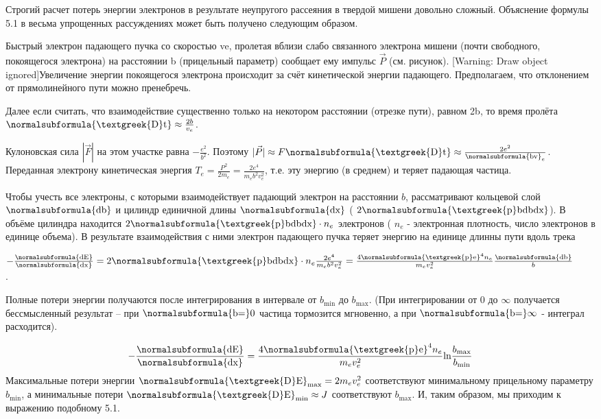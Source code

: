 \documentclass[a4paper,14pt, openany, twoside, draft]{extbook} %
\begin{document}
Строгий расчет потерь энергии электронов в результате неупругого рассеяния в твердой мишени довольно сложный. Объяснение формулы 5.1 в весьма упрощенных рассуждениях может быть получено следующим образом.

Быстрый электрон падающего пучка со скоростью ve, пролетая вблизи слабо связанного электрона мишени (почти свободного, покоящегося электрона) на расстоянии b (прицельный параметр) сообщает ему импульс  $\vec P$ (см. рисунок).  [Warning: Draw object ignored]Увеличение энергии покоящегося электрона происходит за счёт кинетической энергии падающего. Предполагаем, что отклонением от прямолинейного пути можно пренебречь.

Далее если считать, что взаимодействие существенно только на некотором расстоянии (отрезке пути), равном 2b, то время пролёта  $\normalsubformula{\text{\textgreek{D}t}}\approx \frac{2b}{v_e}$.

Кулоновская сила  $|\overrightarrow F|$ на этом участке равна  $-\frac{e^2}{b^2}$.  Поэтому  $|\vec P|\approx F\normalsubformula{\text{\textgreek{D}t}}\approx \frac{2e^2}{\normalsubformula{\text{bv}}_e}$. Переданная электрону кинетическая энергия  $T_e=\frac{P^2}{2m_e}=\frac{2e^4}{m_eb^2v_e^2}$, т.е. эту энергию (в среднем) и теряет падающая частица.

Чтобы учесть все электроны, с которыми взаимодействует падающий электрон на расстоянии  $b$, рассматривают кольцевой слой  $\normalsubformula{\text{db}}$ и цилиндр единичной длины  $\normalsubformula{\text{dx}}$ ( $2\normalsubformula{\text{\textgreek{p}bdbdx}}$). В объёме цилиндра находится  $2\normalsubformula{\text{\textgreek{p}bdbdx}}\cdot n_e$ электронов ( $n_e$ - электронная плотность, число электронов в единице объема). В результате взаимодействия с ними электрон падающего пучка теряет энергию на единице длинны пути вдоль трека

 $-\frac{\normalsubformula{\text{dE}}}{\normalsubformula{\text{dx}}}=2\normalsubformula{\text{\textgreek{p}bdbdx}}\cdot n_e\frac{2e^4}{m_eb^2v_e^2}=\frac{4\normalsubformula{\text{\textgreek{p}e}}^4n_e}{m_ev_e^2}\frac{\normalsubformula{\text{db}}} b$.\ \ \ \ \ \

Полные потери энергии получаются после интегрирования в интервале от  $b_{\text{min}}$ до  $b_{\text{max}}$. (При интегрировании от 0 до  $\infty $ получается бессмысленный результат – при  $\normalsubformula{\text{b=}}0$ частица тормозится мгновенно, а при  $\normalsubformula{\text{b=}}\infty $ - интеграл расходится).

\begin{equation*}
-\frac{\normalsubformula{\text{dE}}}{\normalsubformula{\text{dx}}}=\frac{4\normalsubformula{\text{\textgreek{p}e}}^4n_e}{m_ev_e^2}\text{ln}\frac{b_{\text{max}}}{b_{\text{min}}}
\end{equation*}
Максимальные потери энергии  $\normalsubformula{\text{\textgreek{D}E}}_{\text{max}}=2m_ev_e^2$ соответствуют минимальному прицельному параметру  $b_{\text{min}}$, а минимальные потери  $\normalsubformula{\text{\textgreek{D}E}}_{\text{min}}\approx J$ соответствуют  $b_{\text{max}}$. И, таким образом, мы приходим к выражению подобному 5.1.
\end{document}
